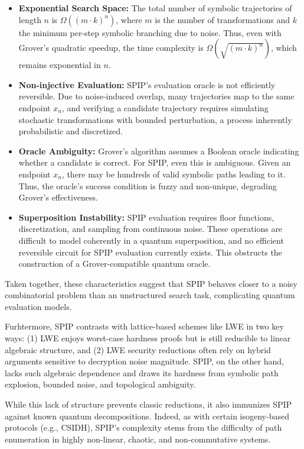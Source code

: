 \documentclass[twocolumn,10pt]{article}
\begin{document}
\begin{itemize}
    \item \textbf{Exponential Search Space:} The total number of symbolic trajectories of length $n$ is $\Omega((m \cdot k)^n)$, where $m$ is the number of transformations and $k$ the minimum per-step symbolic branching due to noise. Thus, even with Grover's quadratic speedup, the time complexity is $\Omega(\sqrt{(m \cdot k)^n})$, which remains exponential in $n$.

    \item \textbf{Non-injective Evaluation:} SPIP's evaluation oracle is not efficiently reversible. Due to noise-induced overlap, many trajectories map to the same endpoint $x_n$, and verifying a candidate trajectory requires simulating stochastic transformations with bounded perturbation, a process inherently probabilistic and discretized.

    \item \textbf{Oracle Ambiguity:} Grover’s algorithm assumes a Boolean oracle indicating whether a candidate is correct. For SPIP, even this is ambiguous. Given an endpoint $x_n$, there may be hundreds of valid symbolic paths leading to it. Thus, the oracle’s success condition is fuzzy and non-unique, degrading Grover’s effectiveness.

    \item \textbf{Superposition Instability:} SPIP evaluation requires floor functions, discretization, and sampling from continuous noise. These operations are difficult to model coherently in a quantum superposition, and no efficient reversible circuit for SPIP evaluation currently exists. This obstructs the construction of a Grover-compatible quantum oracle.
\end{itemize}

Taken together, these characteristics suggest that SPIP behaves closer to a noisy combinatorial problem than an unstructured search task, complicating quantum evaluation models.


Furhtermore, SPIP contrasts with lattice-based schemes like LWE in two key ways: (1) LWE enjoys worst-case hardness proofs but is still reducible to linear algebraic structure, and (2) LWE security reductions often rely on hybrid arguments sensitive to decryption noise magnitude. SPIP, on the other hand, lacks such algebraic dependence and draws its hardness from symbolic path explosion, bounded noise, and topological ambiguity.

While this lack of structure prevents classic reductions, it also immunizes SPIP against known quantum decompositions. Indeed, as with certain isogeny-based protocols (e.g., CSIDH), SPIP’s complexity stems from the difficulty of path enumeration in highly non-linear, chaotic, and non-commutative systems.
\end{document}
